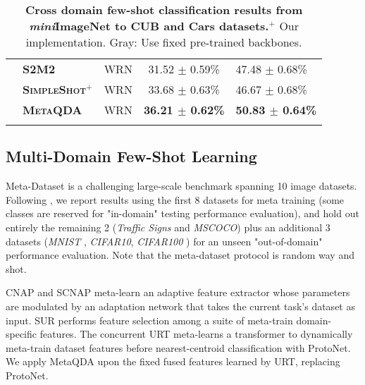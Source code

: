 \documentclass[10pt,twocolumn,letterpaper]{article}
\def\miniIN{\textit{mini}ImageNet}
\begin{document}
\begin{table}[t]
{\begin{tabular}{@{} cllcc @{}}
\cmidrule{2-5}
&\cellcolor{Gray}\textbf{\textsc{S2M2}}  \cite{mangla2020charting} & \cellcolor{Gray} WRN & \cellcolor{Gray} 31.52 $\pm$ 0.59\% & \cellcolor{Gray} 47.48 $\pm$ 0.68\% \ \\
&\cellcolor{Gray}\textbf{\textsc{SimpleShot}}$^+$ \cite{wang2019simpleshot} & \cellcolor{Gray}  WRN & \cellcolor{Gray} 33.68 $\pm$ 0.63\%  & \cellcolor{Gray} 46.67 $\pm$ 0.68\% \ \\
&\cellcolor{Gray}\textbf{\textsc{MetaQDA}} & \cellcolor{Gray} WRN &  \cellcolor{Gray} \textbf{36.21 $\pm$ 0.62\%} & \cellcolor{Gray} \textbf{50.83 $\pm$ 0.64\%} \\

\bottomrule \\
\end{tabular}
}

\caption{\small \small
\textbf{Cross domain few-shot classification results from \miniIN{} to CUB and Cars datasets.}$^+$  Our implementation. Gray: Use fixed pre-trained backbones.
}
\vspace{-1.5em}
\label{tab:cdfsl}
\end{table}


\subsection{Multi-Domain Few-Shot Learning}

Meta-Dataset \cite{triantafillou2019meta} is a challenging large-scale benchmark spanning 10 image datasets. Following \cite{requeima2019cnaps, bateni2020improved}, we report results using the first 8 datasets for meta training (some classes are reserved for "in-domain" testing performance evaluation), and hold out entirely the remaining 2 (\textit{Traffic Signs} and \textit{MSCOCO}) plus an additional 3 datasets (\textit{MNIST} \cite{lecun2010mnist}, \textit{CIFAR10}, \textit{CIFAR100} \cite{krizhevsky2009learning}) for an unseen "out-of-domain" performance evaluation. Note that the meta-dataset protocol is random way and shot.

  CNAP \cite{requeima2019cnaps} and SCNAP \cite{bateni2020improved} meta-learn an adaptive feature extractor whose parameters are modulated by an adaptation network that takes the current task’s dataset as input. SUR \cite{dvornik2020selecting}  performs feature selection among a suite of meta-train domain-specific features. The concurrent URT \cite{liu2020universal} meta-learns a transformer to dynamically meta-train dataset features before nearest-centroid classification with ProtoNet. We apply MetaQDA upon the fixed fused features learned by URT, replacing ProtoNet. 
\end{document}
